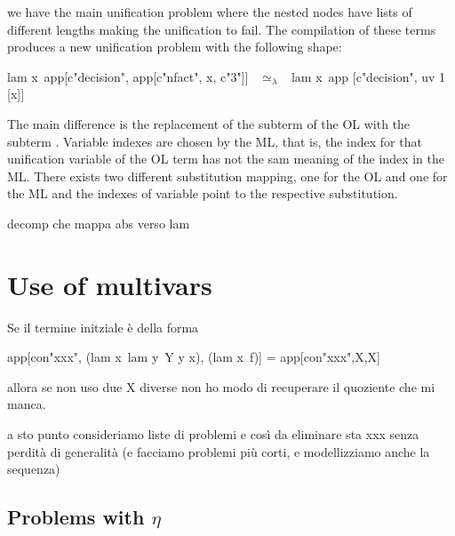 \documentclass[sigconf,natbib=false]{acmart}
\newcommand{\UnifRel}{\ensuremath{\simeq}}
\newcommand{\Ue}{\ensuremath{\UnifRel_\lambda}\xspace}
\begin{document}
\noindent
we have the main unification problem where the nested  nodes have
lists of different lengths making the unification to fail. The compilation of 
these terms produces a new unification problem with the following shape:

\begin{elpicode}
  lam x\ app[c"decision", app[c"nfact", x, c"3"]] ~\Ue~
    lam x\ app [c"decision", uv 1 [x]]
\end{elpicode}

\noindent
The main difference is the replacement of the subterm  of
the OL with the subterm . Variable indexes are chosen by the
ML, that is, the index  for that unification variable of the OL term
has not the sam meaning of the index  in the ML. There exists two
different substitution mapping, one for the OL and one for the ML and the indexes
of variable point to the respective substitution.

decomp che mappa abs verso lam
\noindent
{}

\section{Use of multivars}

Se il termine initziale è della forma

\begin{elpicode}
  app[con"xxx", (lam x\ lam y\ Y y x), (lam x\ f)]
  =
  app[con"xxx",X,X]
\end{elpicode}

allora se non uso due X diverse non ho modo di recuperare il quoziente che mi manca.

a sto punto consideriamo liste di problemi e così da eliminare sta xxx senza
perdità di generalità (e facciamo problemi più corti, e modellizziamo anche la
sequenza)

\subsection{Problems with $\eta$}
\end{document}
